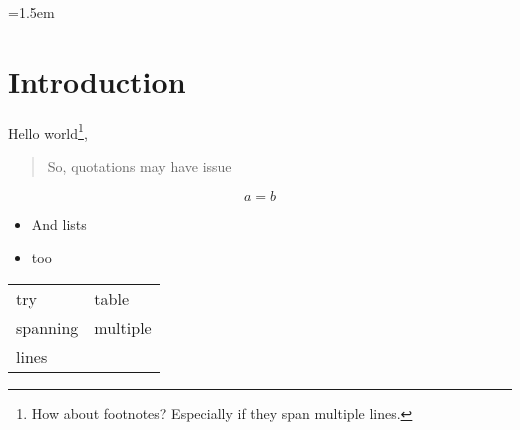 \documentclass{article}
\begin{document}
\parindent=1.5em

\section{Introduction}

Hello world\footnote{How about footnotes? Especially if they span multiple lines. \lipsum[6]}, \lipsum[1-2]

\begin{quotation}
  So, quotations may have issue
\end{quotation}

\lipsum[2]
\[
  a=b
\]
\lipsum[6]

\begin{itemize}
  \item And lists
  \item too
\end{itemize}

\lipsum[3]


\begin{table}[hbp]
  \begin{tabular}{l l}
    try & table\\
    spanning & multiple\\
    lines & \\
  \end{tabular}
\end{table}

\lipsum[2-3]

\noindent{}
\end{document}
